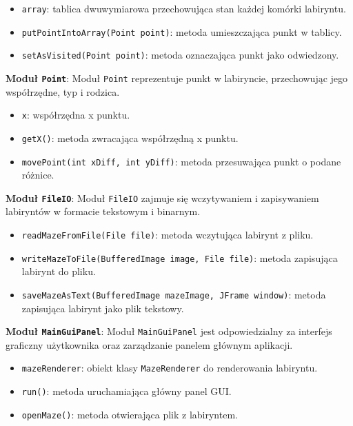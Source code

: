 \documentclass{article}
\begin{document}
\begin{itemize}
  \item \texttt{array}: tablica dwuwymiarowa przechowująca stan każdej komórki labiryntu.
  \item \texttt{putPointIntoArray(Point point)}: metoda umieszczająca punkt w tablicy.
  \item \texttt{setAsVisited(Point point)}: metoda oznaczająca punkt jako odwiedzony.
\end{itemize}

\textbf{Moduł \texttt{Point}}: Moduł \texttt{Point} reprezentuje punkt w labiryncie, przechowując jego współrzędne, typ i rodzica.

\begin{itemize}
  \item \texttt{x}: współrzędna x punktu.
  \item \texttt{getX()}: metoda zwracająca współrzędną x punktu.
  \item \texttt{movePoint(int xDiff, int yDiff)}: metoda przesuwająca punkt o podane różnice.
\end{itemize}

\textbf{Moduł \texttt{FileIO}}: Moduł \texttt{FileIO} zajmuje się wczytywaniem i zapisywaniem labiryntów w formacie tekstowym i binarnym.

\begin{itemize}
  \item \texttt{readMazeFromFile(File file)}: metoda wczytująca labirynt z pliku.
  \item \texttt{writeMazeToFile(BufferedImage image, File file)}: metoda zapisująca labirynt do pliku.
  \item \texttt{saveMazeAsText(BufferedImage mazeImage, JFrame window)}: metoda zapisująca labirynt jako plik tekstowy.
\end{itemize}

\textbf{Moduł \texttt{MainGuiPanel}}: Moduł \texttt{MainGuiPanel} jest odpowiedzialny za interfejs graficzny użytkownika oraz zarządzanie panelem głównym aplikacji.

\begin{itemize}
  \item \texttt{mazeRenderer}: obiekt klasy \texttt{MazeRenderer} do renderowania labiryntu.
  \item \texttt{run()}: metoda uruchamiająca główny panel GUI.
  \item \texttt{openMaze()}: metoda otwierająca plik z labiryntem.
\end{itemize}
\end{document}
